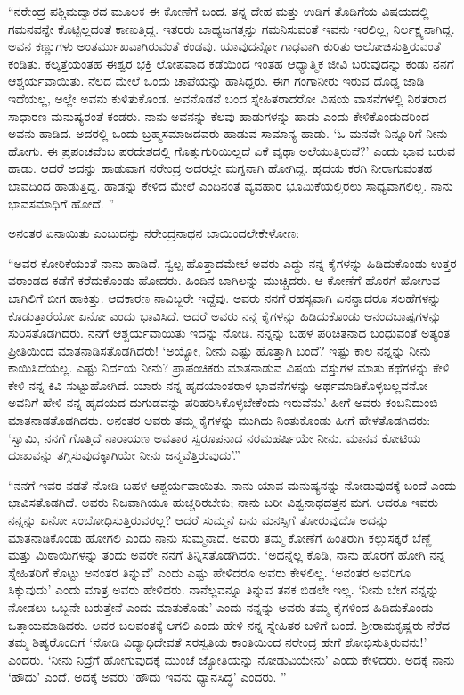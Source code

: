 “ನರೇಂದ್ರ ಪಶ್ಚಿಮದ್ವಾರದ ಮೂಲಕ ಈ ಕೋಣೆಗೆ ಬಂದ. ತನ್ನ ದೇಹ ಮತ್ತು ಉಡಿಗೆ ತೊಡಿಗೆಯ ವಿಷಯದಲ್ಲಿ ಗಮನವನ್ನೇ ಕೊಟ್ಟಿಲ್ಲದಂತೆ ಕಾಣುತ್ತಿದ್ದ. ಇತರರು ಬಾಹ್ಯಜಗತ್ತನ್ನು ಗಮನಿಸುವಂತೆ ಇವನು ಇರಲಿಲ್ಲ, ನಿರ್ಲಕ್ಷ್ಯನಾಗಿದ್ದ. ಅವನ ಕಣ್ಣುಗಳು ಅಂತರ್ಮುಖವಾಗಿರುವಂತೆ ಕಂಡವು. ಯಾವುದನ್ನೋ ಗಾಢವಾಗಿ ಕುರಿತು ಆಲೋಚಿಸುತ್ತಿರುವಂತೆ ಕಂಡಿತು. ಕಲ್ಕತ್ತೆಯಂತಹ ಈಶ್ವರ ಭಕ್ತಿ ಲೋಪವಾದ ಕಡೆಯಿಂದ ಇಂತಹ ಆಧ್ಯಾತ್ಮಿಕ ಜೀವಿ ಬರುವುದನ್ನು ಕಂಡು ನನಗೆ ಆಶ್ಚರ್ಯವಾಯಿತು. ನೆಲದ ಮೇಲೆ ಒಂದು ಚಾಪೆಯನ್ನು ಹಾಸಿದ್ದರು. ಈಗ ಗಂಗಾನೀರು ಇರುವ ದೊಡ್ಡ ಜಾಡಿ ಇದೆಯಲ್ಲ, ಅಲ್ಲೇ ಅವನು ಕುಳಿತುಕೊಂಡ. ಅವನೊಡನೆ ಬಂದ ಸ್ನೇಹಿತರಾದರೋ ವಿಷಯ ವಾಸನೆಗಳಲ್ಲಿ ನಿರತರಾದ ಸಾಧಾರಣ ಮನುಷ್ಯರಂತೆ ಕಂಡರು. ನಾನು ಅವನನ್ನು ಕೆಲವು ಹಾಡುಗಳನ್ನು ಹಾಡು ಎಂದು ಕೇಳಿಕೊಂಡುದರಿಂದ ಅವನು ಹಾಡಿದ. ಅದರಲ್ಲಿ ಒಂದು ಬ್ರಹ್ಮಸಮಾಜದವರು ಹಾಡುವ ಸಾಮಾನ್ಯ ಹಾಡು. ‘ಓ ಮನವೇ ನಿನ್ನೂರಿಗೆ ನೀನು ಹೋಗು. ಈ ಪ್ರಪಂಚವೆಂಬ ಪರದೇಶದಲ್ಲಿ ಗೊತ್ತುಗುರಿಯಿಲ್ಲದೆ ಏಕೆ ವೃಥಾ ಅಲೆಯುತ್ತಿರುವೆ?’ ಎಂದು ಭಾವ ಬರುವ ಹಾಡು. ಆದರೆ ಅದನ್ನು ಹಾಡುವಾಗ ನರೇಂದ್ರ ಅದರಲ್ಲೇ ಮಗ್ನನಾಗಿ ಹೋಗಿದ್ದ. ಹೃದಯ ಕರಗಿ ನೀರಾಗುವಂತಹ ಭಾವದಿಂದ ಹಾಡುತ್ತಿದ್ದ. ಹಾಡನ್ನು ಕೇಳಿದ ಮೇಲೆ ಎಂದಿನಂತೆ ವ್ಯವಹಾರ ಭೂಮಿಕೆಯಲ್ಲಿರಲು ಸಾಧ್ಯವಾಗಲಿಲ್ಲ. ನಾನು ಭಾವಸಮಾಧಿಗೆ ಹೋದೆ. ”

ಅನಂತರ ಏನಾಯಿತು ಎಂಬುದನ್ನು ನರೇಂದ್ರನಾಥನ ಬಾಯಿಂದಲೇ\break ಕೇಳೋಣ:

“ಅವರ ಕೋರಿಕೆಯಂತೆ ನಾನು ಹಾಡಿದೆ. ಸ್ವಲ್ಪ ಹೊತ್ತಾದಮೇಲೆ ಅವರು ಎದ್ದು ನನ್ನ ಕೈಗಳನ್ನು ಹಿಡಿದುಕೊಂಡು ಉತ್ತರ ವರಾಂಡದ ಕಡೆಗೆ ಕರೆದುಕೊಂಡು ಹೋದರು. ಹಿಂದಿನ ಬಾಗಿಲನ್ನು ಮುಚ್ಚಿದರು. ಆ ಕೋಣೆಗೆ ಹೊರಗೆ ಹೋಗುವ ಬಾಗಿಲಿಗೆ ಬೀಗ ಹಾಕಿತ್ತು. ಆದಕಾರಣ ನಾವಿಬ್ಬರೇ ಇದ್ದೆವು. ಅವರು ನನಗೆ ರಹಸ್ಯವಾಗಿ ಏನನ್ನಾದರೂ ಸಲಹೆಗಳನ್ನು ಕೊಡುತ್ತಾರೆಯೋ ಏನೋ ಎಂದು ಭಾವಿಸಿದೆ. ಆದರೆ ಅವರು ನನ್ನ ಕೈಗಳನ್ನು ಹಿಡಿದುಕೊಂಡು ಆನಂದಬಾಷ್ಪಗಳನ್ನು ಸುರಿಸತೊಡಗಿದರು. ನನಗೆ ಆಶ್ಚರ್ಯವಾಯಿತು ಇದನ್ನು ನೋಡಿ. ನನ್ನನ್ನು ಬಹಳ ಪರಿಚಿತನಾದ ಬಂಧುವಂತೆ ಅತ್ಯಂತ ಪ್ರೀತಿಯಿಂದ ಮಾತನಾಡಿಸತೊಡಗಿದರು! ‘ಅಯ್ಯೋ, ನೀನು ಎಷ್ಟು ಹೊತ್ತಾಗಿ ಬಂದೆ? ಇಷ್ಟು ಕಾಲ ನನ್ನನ್ನು ನೀನು ಕಾಯಿಸಿದೆಯಲ್ಲ. ಎಷ್ಟು ನಿರ್ದಯ ನೀನು? ಪ್ರಾಪಂಚಿಕರು ಮಾತನಾಡುವ ವಿಷಯ ವಸ್ತುಗಳ ಮಾತು ಕಥೆಗಳನ್ನು ಕೇಳಿ ಕೇಳಿ ನನ್ನ ಕಿವಿ ಸುಟ್ಟುಹೋಗಿದೆ. ಯಾರು ನನ್ನ ಹೃದಯಾಂತರಾಳ ಭಾವನೆಗಳನ್ನು ಅರ್ಥಮಾಡಿಕೊಳ್ಳಬಲ್ಲವನೋ ಅವನಿಗೆ ಹೇಳಿ ನನ್ನ ಹೃದಯದ ದುಗುಡವನ್ನು ಪರಿಹರಿಸಿಕೊಳ್ಳಬೇಕೆಂದು ಇರುವೆನು.’ ಹೀಗೆ ಅವರು ಕಂಬನಿದುಂಬಿ ಮಾತನಾಡತೊಡಗಿದರು. ಅನಂತರ ಅವರು ತಮ್ಮ ಕೈಗಳನ್ನು ಮುಗಿದು ನಿಂತುಕೊಂಡು ಹೀಗೆ ಹೇಳತೊಡಗಿದರು: ‘ಸ್ವಾಮಿ, ನನಗೆ ಗೊತ್ತಿದೆ ನಾರಾಯಣ ಅವತಾರ ಸ್ವರೂಪನಾದ ನರಮಹರ್ಷಿಯೇ ನೀನು. ಮಾನವ ಕೋಟಿಯ ದುಃಖವನ್ನು ತಗ್ಗಿಸುವುದಕ್ಕಾಗಿಯೇ ನೀನು ಜನ್ಮವೆತ್ತಿರುವುದು’.”

“ನನಗೆ ಇವರ ನಡತೆ ನೋಡಿ ಬಹಳ ಆಶ್ಚರ್ಯವಾಯಿತು. ನಾನು ಯಾವ ಮನುಷ್ಯನನ್ನು ನೋಡುವುದಕ್ಕೆ ಬಂದೆ ಎಂದು ಭಾವಿಸತೊಡಗಿದೆ. ಅವರು ನಿಜವಾಗಿಯೂ ಹುಚ್ಚರಿರಬೇಕು; ನಾನು ಬರೀ ವಿಶ್ವನಾಥದತ್ತನ ಮಗ. ಆದರೂ ಇವರು ನನ್ನನ್ನು ಏನೋ ಸಂಬೋಧಿಸುತ್ತಿರುವರಲ್ಲ? ಆದರೆ ಸುಮ್ಮನೆ ಏನು ಮನಸ್ಸಿಗೆ ತೋರುವುದೊ ಅದನ್ನು ಮಾತನಾಡಿಕೊಂಡು ಹೋಗಲಿ ಎಂದು ನಾನು ಸುಮ್ಮನಾದೆ. ಅವರು ತಮ್ಮ ಕೋಣೆಗೆ ಹಿಂತಿರುಗಿ ಕಲ್ಲುಸಕ್ಕರೆ ಬೆಣ್ಣೆ ಮತ್ತು ಮಿಠಾಯಿಗಳನ್ನು ತಂದು ಅವರೇ ನನಗೆ ತಿನ್ನಿಸತೊಡಗಿದರು. ‘ಅದನ್ನೆಲ್ಲ ಕೊಡಿ, ನಾನು ಹೊರಗೆ ಹೋಗಿ ನನ್ನ ಸ್ನೇಹಿತರಿಗೆ ಕೊಟ್ಟು ಅನಂತರ ತಿನ್ನುವೆ’ ಎಂದು ಎಷ್ಟು ಹೇಳಿದರೂ ಅವರು ಕೇಳಲಿಲ್ಲ. ‘ಅನಂತರ ಅವರಿಗೂ ಸಿಕ್ಕುವುದು’ ಎಂದು ಮಾತ್ರ ಅವರು ಹೇಳಿದರು. ನಾನೆಲ್ಲವನ್ನೂ ತಿನ್ನುವ ತನಕ ಬಿಡಲೇ ಇಲ್ಲ. ‘ನೀನು ಬೇಗ ನನ್ನನ್ನು ನೋಡಲು ಒಬ್ಬನೇ ಬರುತ್ತೇನೆ ಎಂದು ಮಾತುಕೊಡು’ ಎಂದು ನನ್ನನ್ನು ಅವರು ತಮ್ಮ ಕೈಗಳಿಂದ ಹಿಡಿದುಕೊಂಡು ಒತ್ತಾಯಮಾಡಿದರು. ಅವರ ಬಲವಂತಕ್ಕೆ ಆಗಲಿ ಎಂದು ಹೇಳಿ ನನ್ನ ಸ್ನೇಹಿತರ ಬಳಿಗೆ ಬಂದೆ. ಶ‍್ರೀರಾಮಕೃಷ್ಣರು ನೆರೆದ ತಮ್ಮ ಶಿಷ್ಯರೊಂದಿಗೆ ‘ನೋಡಿ ವಿದ್ಯಾಧಿದೇವತೆ ಸರಸ್ವತಿಯ ಕಾಂತಿಯಿಂದ ನರೇಂದ್ರ ಹೇಗೆ ಶೋಭಿಸುತ್ತಿರುವನು!’ ಎಂದರು. ‘ನೀನು ನಿದ್ರೆಗೆ ಹೋಗುವುದಕ್ಕೆ ಮುಂಚೆ ಜ್ಯೋತಿಯನ್ನು ನೋಡುವಿಯೇನು’ ಎಂದು ಕೇಳಿದರು. ಅದಕ್ಕೆ ನಾನು ‘ಹೌದು’ ಎಂದೆ. ಅದಕ್ಕೆ ಅವರು ‘ಹೌದು ಇವನು ಧ್ಯಾನಸಿದ್ಧ’ ಎಂದರು. ”

